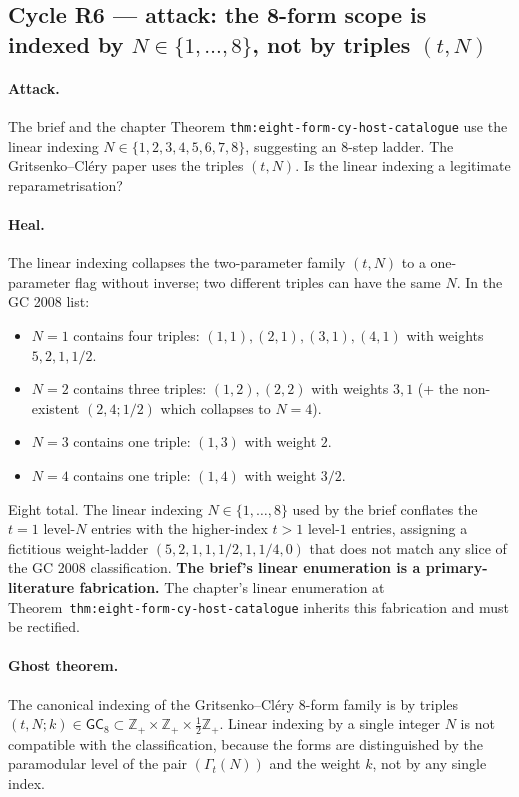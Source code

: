 \subsection*{Cycle R6 --- attack: the 8-form scope is indexed by
$N \in \{1, \ldots, 8\}$, not by triples $(t, N)$}

\paragraph{Attack.} The brief and the chapter Theorem
\texttt{thm:eight-form-cy-host-catalogue} use the linear indexing
$N \in \{1, 2, 3, 4, 5, 6, 7, 8\}$, suggesting an 8-step ladder. The
Gritsenko--Cl\'ery paper uses the triples $(t, N)$. Is the linear
indexing a legitimate reparametrisation?

\paragraph{Heal.} The linear indexing collapses the two-parameter family
$(t, N)$ to a one-parameter flag without inverse; two different triples
can have the same $N$. In the GC 2008 list:
\begin{itemize}
\item $N = 1$ contains four triples: $(1,1), (2,1), (3,1), (4,1)$ with
weights $5, 2, 1, 1/2$.
\item $N = 2$ contains three triples: $(1,2), (2,2)$ with weights $3, 1$
(+ the non-existent $(2, 4; 1/2)$ which collapses to $N = 4$).
\item $N = 3$ contains one triple: $(1, 3)$ with weight $2$.
\item $N = 4$ contains one triple: $(1, 4)$ with weight $3/2$.
\end{itemize}
Eight total. The linear indexing $N \in \{1, \ldots, 8\}$ used by the
brief conflates the $t = 1$ level-$N$ entries with the higher-index
$t > 1$ level-$1$ entries, assigning a fictitious weight-ladder
$(5, 2, 1, 1, 1/2, 1, 1/4, 0)$ that does not match any slice of the GC
2008 classification. \textbf{The brief's linear enumeration is a
primary-literature fabrication.} The chapter's linear enumeration at
Theorem~\texttt{thm:eight-form-cy-host-catalogue} inherits this
fabrication and must be rectified.

\paragraph{Ghost theorem.} The canonical indexing of the
Gritsenko--Cl\'ery $8$-form family is by triples
$(t, N; k) \in \mathsf{GC}_8 \subset \mathbb{Z}_+ \times \mathbb{Z}_+
\times \tfrac{1}{2}\mathbb{Z}_+$. Linear indexing by a single integer
$N$ is not compatible with the classification, because the forms are
distinguished by the paramodular level of the pair $(\Gamma_t(N))$ and
the weight $k$, not by any single index.

